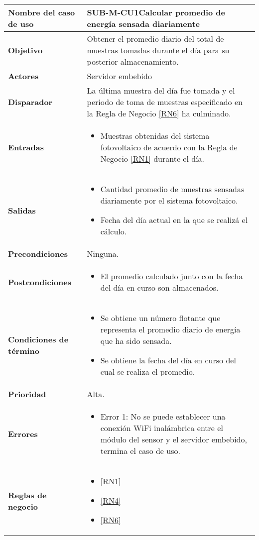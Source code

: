 \begin{longtable}{|J{5cm}|J{10.3cm}|}
	\hline
	\textbf{Nombre del caso de uso} &
		SUB-M-CU1Calcular promedio de energía sensada diariamente \\ \hline
	\textbf{Objetivo} &
		Obtener el promedio diario del total de muestras tomadas durante el día para su posterior almacenamiento. \\ \hline
	\textbf{Actores} &
		Servidor embebido \\ \hline 
	\textbf{Disparador} & 
		La última muestra del día fue tomada y el periodo de toma de muestras especificado en la Regla de Negocio \ref{RN6} ha culminado. \\ \hline 
	\textbf{Entradas} & 
		\begin{itemize}
				\item Muestras obtenidas del sistema fotovoltaico de acuerdo con la Regla de Negocio \ref{RN1} durante el día.
		\end{itemize}\\ \hline 
	\textbf{Salidas} & 
		\begin{itemize}
			\item Cantidad promedio de muestras sensadas diariamente por el sistema fotovoltaico.
			\item Fecha del día actual en la que se realizá el cálculo.
		\end{itemize} \\ \hline
	\textbf{Precondiciones} &
		Ninguna.\\ \hline
	\textbf{Postcondiciones} &
		\begin{itemize}
			\item El promedio calculado junto con la fecha del día en curso son almacenados.
		\end{itemize}\\ \hline
	\textbf{Condiciones de término} & 
		\begin{itemize}
			\item Se obtiene un número flotante que representa el promedio diario de energía que ha sido sensada.
			\item Se obtiene la fecha del día en curso del cual se realiza el promedio.
		\end{itemize} \\ \hline 
	\textbf{Prioridad} & 
		Alta. \\ \hline
	\textbf{Errores} & 
		\begin{itemize}
			\item \label{SUB-M-CU1:Error1} Error 1: No se puede establecer una conexión WiFi inalámbrica entre el módulo del sensor y el servidor embebido, termina el caso de uso.
		\end{itemize} \\ \hline
	\textbf{Reglas de negocio} & 
		\begin{itemize}
		    \item \ref{RN1}
			\item \ref{RN4}
			\item \ref{RN6}
		\end{itemize} \\ \hline

\end{longtable}

